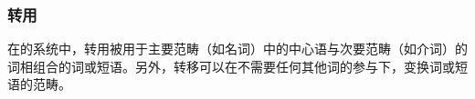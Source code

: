 \subsubsection{转用}
\label{sec-transfer-dg}

在\tes 的系统中，转用被用于主要范畴（如名词）中的中心语与次要范畴（如介词）的词相组合的词或短语。另外，转移可以在不需要任何其他词的参与下，变换词或短语的范畴。

